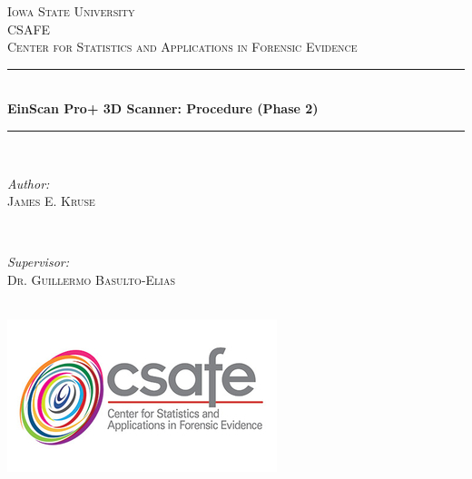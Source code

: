 \begin{titlepage}

\newcommand{\HRule}{\rule{\linewidth}{0.5mm}} %

\center %
 

\textsc{\LARGE Iowa State University}\\[1.5cm] %
\textsc{\Large CSAFE}\\[0.5cm] %
\textsc{\large Center for Statistics and Applications in Forensic Evidence }\\[0.5cm] %


\HRule \\[0.4cm]
{ \huge \bfseries EinScan Pro+ 3D Scanner: Procedure (Phase 2)  }\\[0.4cm] %
\HRule \\[1.5cm]
 

\begin{minipage}{0.4\textwidth}
\begin{flushleft} \large
\emph{Author:}\\
\textsc{James E. Kruse} %
\end{flushleft}
\end{minipage}
~
\begin{minipage}{0.4\textwidth}
\begin{flushright} \large
\emph{Supervisor:} \\
\textsc{Dr. Guillermo Basulto-Elias} %
\end{flushright}
\end{minipage}\\[2cm]

\includegraphics[scale=.5]{Logo}\\[1cm]


\end{titlepage}
